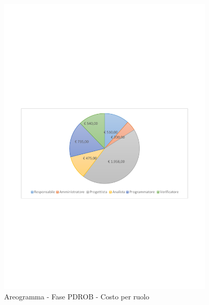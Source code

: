 \documentclass[../PianoProgetto.tex]{subfiles}
\begin{document}
	\begin{figure}[!h]
		\centering
		\includegraphics[width=0.93\textwidth , trim=2cm 9.5cm 2cm 11cm]{grafici/PDROB/PDROB-costo}
			\caption{Areogramma - Fase PDROB - Costo per ruolo}
		\label{fig:CircleChart-fasePDROB_costo}
	\end{figure}
\vfill	
\end{document}
